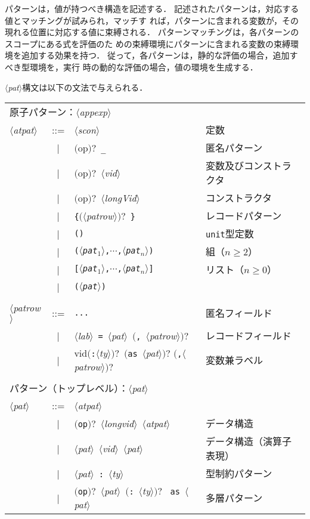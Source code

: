 \documentclass{jbook}
\newcommand{\vbar}{\mbox{\ $|$\ }}
\newcommand{\nonterm}[1]{\mbox{$\langle$}{\it #1}\mbox{$\rangle$}}
\newcommand{\term}[1]{\mbox{{\tt #1}}}
\newcommand{\optional}[1]{\mbox{$($}{\protect #1}\mbox{$)?$}}
\begin{document}
	パターンは，値が持つべき構造を記述する．
	記述されたパターンは，対応する値とマッチングが試みられ，マッチす
れば，パターンに含まれる変数が，その現れる位置に対応する値に束縛される．
	パターンマッチングは，各パターンのスコープにある式を評価のた
めの束縛環境にパターンに含まれる変数の束縛環境を追加する効果を持つ．
	従って，各パターンは，静的な評価の場合，追加すべき型環境を，実行
時の動的な評価の場合，値の環境を生成する．

\nonterm{pat}構文は以下の文法で与えられる．

\begin{center}
\begin{tabular}{lcll}
\multicolumn{3}{l}{原子パターン：\nonterm{appexp}}\\
\nonterm{atpat} &::=&\nonterm{scon} & 定数\\
&\vbar&\optional{op}\ \term{\_} & 匿名パターン\\
&\vbar&\optional{op}\ \nonterm{vid} & 変数及びコンストラクタ\\
&\vbar&\optional{op}\ \nonterm{longVid} & コンストラクタ\\
&\vbar&\term{\{}\optional{\nonterm{patrow}}\ \term{\}}& レコードパターン\\
&\vbar&\term{()}& \term{unit}型定数\\
&\vbar&\term{(\nonterm{pat$_1$},$\cdots$,\nonterm{pat$_n$})}& 組（$n\ge 2$）\\
&\vbar&\term{[\nonterm{pat$_1$},$\cdots$,\nonterm{pat$_n$}]}& リスト（$n\ge 0$）\\
&\vbar&\term{(\nonterm{pat})}& \\
\\
\nonterm{patrow}&::=& \verb|...| & 匿名フィールド\\
&\vbar&\nonterm{lab}\ \term{=}\ \nonterm{pat}\ \optional{\term{,}\ \nonterm{patrow}} & レコードフィールド\\
&\vbar&vid\optional{\term{:}\nonterm{ty}}\ \optional{\term{as}\ \nonterm{pat}}
\optional{\term{,}\nonterm{patrow}} & 変数兼ラベル\\
\\
\multicolumn{3}{l}{パターン（トップレベル）：\nonterm{pat}}\\
\nonterm{pat} &::=& \nonterm{atpat} \\
&\vbar &\optional{\term{op}}\ \nonterm{longvid}\ \nonterm{atpat}& データ構造\\
&\vbar &\nonterm{pat}\ \nonterm{vid}\ \nonterm{pat} & データ構造（演算子表現）\\
&\vbar &\nonterm{pat}\ \term{:}\ \nonterm{ty} & 型制約パターン\\
&\vbar &\optional{\term{op}}\ \nonterm{pat}\ \optional{\term{:}\ \nonterm{ty}} {\tt
as}\ \nonterm{pat} & 多層パターン
\end{tabular}
\end{center}
\end{document}

